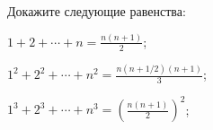 Докажите следующие равенства:
\begin{enumcyr}
    \item $1 + 2 + \dotsb + n = \frac{n (n + 1)}{2}$;
    \item $1^2 + 2^2 + \dotsb + n^2 = \frac{n (n + 1 / 2)(n + 1)}{3}$;
    \item $1^3 + 2^3 + \dotsb + n^3 = \left( \frac{n (n + 1)}{2} \right)^2$;
\end{enumcyr}

